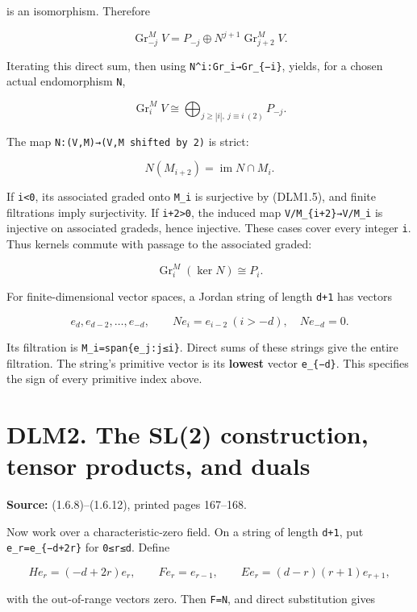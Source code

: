 \documentclass[
]{report}
\begin{document}
is an isomorphism. Therefore

\[
\operatorname{Gr}_{-j}^M V
=P_{-j}\oplus N^{j+1}\operatorname{Gr}_{j+2}^M V.
\tag{DLM1.4}
\]

Iterating this direct sum, then using \texttt{N\^{}i:Gr\_i→Gr\_\{−i\}},
yields, for a chosen actual endomorphism \texttt{N},

\[
\operatorname{Gr}_i^M V\cong
\bigoplus_{j\ge |i|,\ j\equiv i\ (2)}P_{-j}.
\tag{DLM1.5}
\]

The map \nolinkurl{N:(V,M)→(V,M shifted by 2)} is strict:

\[
N(M_{i+2})=\operatorname{im}N\cap M_i.
\tag{DLM1.6}
\]

If \texttt{i\textless{}0}, its associated graded onto \texttt{M\_i} is
surjective by (DLM1.5), and finite filtrations imply surjectivity. If
\texttt{i+2\textgreater{}0}, the induced map
\texttt{V/M\_\{i+2\}→V/M\_i} is injective on associated gradeds, hence
injective. These cases cover every integer \texttt{i}. Thus kernels
commute with passage to the associated graded:

\[
\operatorname{Gr}_i^M(\ker N)\cong P_i.
\tag{DLM1.7}
\]

For finite-dimensional vector spaces, a Jordan string of length
\texttt{d+1} has vectors

\[
e_d,e_{d-2},\ldots,e_{-d},\qquad
Ne_i=e_{i-2}\ (i> -d),\quad Ne_{-d}=0.
\]

Its filtration is \texttt{M\_i=span\{e\_j:j≤i\}}. Direct sums of these
strings give the entire filtration. The string's primitive vector is its
\textbf{lowest} vector \texttt{e\_\{−d\}}. This specifies the sign of
every primitive index above.

\section{DLM2. The SL(2) construction, tensor products, and
duals}\label{dlm2.-the-sl2-construction-tensor-products-and-duals}

\textbf{Source:} (1.6.8)--(1.6.12), printed pages 167--168.

Now work over a characteristic-zero field. On a string of length
\texttt{d+1}, put \texttt{e\_r=e\_\{−d+2r\}} for \texttt{0≤r≤d}. Define

\[
H e_r=(-d+2r)e_r,\qquad
F e_r=e_{r-1},\qquad
E e_r=(d-r)(r+1)e_{r+1},
\tag{DLM2.1}
\]

with the out-of-range vectors zero. Then \texttt{F=N}, and direct
substitution gives
\end{document}

